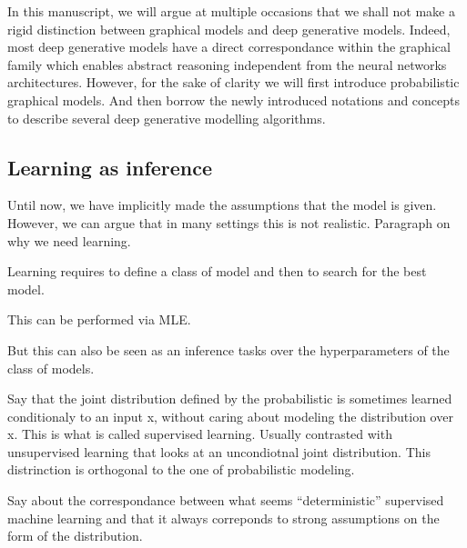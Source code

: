 In this manuscript, we will argue at multiple occasions that we shall not make a rigid distinction between graphical models and deep generative models. Indeed, most deep generative models have a direct correspondance within the graphical family which enables abstract reasoning independent from the neural networks architectures. However, for the sake of clarity we will first introduce probabilistic graphical models. And then borrow the newly introduced notations and concepts to describe several deep generative modelling algorithms.

%

\subsection{Learning as inference}
Until now, we have implicitly made the assumptions that the model is given. However, we can argue that in many settings this is not realistic.
Paragraph on why we need learning.

Learning requires to define a class of model and then to search for the best model.

This can be performed via MLE.

But this can also be seen as an inference tasks over the hyperparameters of the class of models.

Say that the joint distribution defined by the probabilistic is sometimes learned conditionaly to an input x, without caring about modeling the distribution over x. This is what is called supervised learning. Usually contrasted with unsupervised learning that looks at an uncondiotnal joint distribution. This distrinction is orthogonal to the one of probabilistic modeling.

Say about the correspondance between what seems ``deterministic'' supervised machine learning and that it always correponds to strong assumptions on the form of the distribution.



